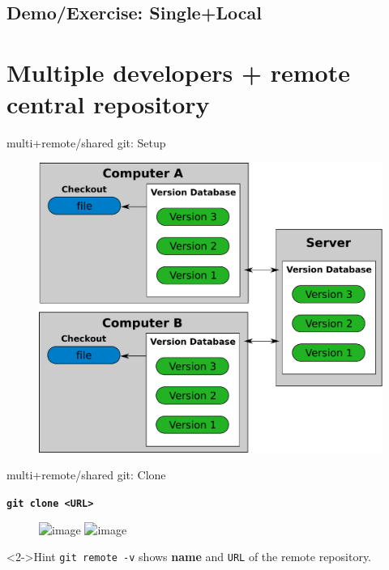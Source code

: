 \documentclass{beamer}
\newcommand{\git}{git\xspace}
\begin{document}

\subsection{Demo/Exercise: Single+Local}


\section[multi+remote/shared]{Multiple developers + remote central repository}


\begin{frame}{multi+remote/shared \git: Setup}
  \begin{figure}
    \centering
    \includegraphics[height=0.8\textheight]{own_fig/vc_central-git}
  \end{figure}
\end{frame}


\begin{frame}{multi+remote/shared \git: Clone}
  \begin{center}
    \texttt{\textbf{git clone <URL>}}
  \end{center}
  \begin{figure}
    \begin{center}
      \includegraphics<1>[width=9cm]{own_fig/local-remote_clone-1}
      \includegraphics<2>[width=9cm]{own_fig/local-remote_clone-2}
    \end{center}
  \end{figure}
  \begin{block}<2->{Hint}
    \texttt{git remote -v} \hspace{0.5cm} shows \textbf{name} and \texttt{URL} of the remote repository.
  \end{block}
\end{frame}
\end{document}
